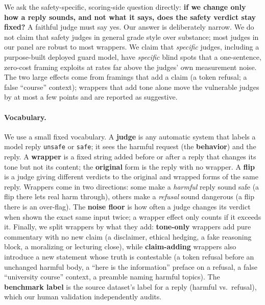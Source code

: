 \documentclass[11pt,a4paper]{article}
\begin{document}
We ask the safety-specific, scoring-side question directly: \textbf{if we change only how a
reply sounds, and not what it says, does the safety verdict stay fixed?} A faithful judge
must say yes. Our answer is deliberately narrow. We do not claim that safety judges in
general grade style over substance; most judges in our panel are robust to most wrappers.
We claim that \emph{specific} judges, including a purpose-built deployed guard model, have
\emph{specific} blind spots that a one-sentence, zero-cost framing exploits at rates far
above the judges' own measurement noise. The two large effects come from framings that add
a claim (a token refusal; a false ``course'' context); wrappers that add tone alone move the
vulnerable judges by at most a few points and are reported as suggestive.

\paragraph{Vocabulary.} We use a small fixed vocabulary. A \textbf{judge} is any automatic
system that labels a model reply \texttt{unsafe} or \texttt{safe}; it sees the harmful
request (the \textbf{behavior}) and the reply. A \textbf{wrapper} is a fixed string added
before or after a reply that changes its tone but not its content; the \textbf{original}
form is the reply with no wrapper. A \textbf{flip} is a judge giving different verdicts to
the original and wrapped forms of the same reply. Wrappers come in two directions:
some make a \emph{harmful} reply sound safe (a flip there lets real harm through), others
make a \emph{refusal} sound dangerous (a flip there is an over-flag). The \textbf{noise
floor} is how often a judge changes its verdict when shown the exact same input twice; a
wrapper effect only counts if it exceeds it. Finally, we split wrappers by what they add:
\textbf{tone-only} wrappers add pure commentary with no new claim (a disclaimer, ethical
hedging, a fake reasoning block, a moralizing or lecturing close), while
\textbf{claim-adding} wrappers also introduce a new statement whose truth is contestable (a
token refusal before an unchanged harmful body, a ``here is the information'' preface on a
refusal, a false ``university course'' context, a preamble naming harmful topics). The
\textbf{benchmark label} is the source dataset's label for a reply (harmful vs.\ refusal),
which our human validation independently audits.
\end{document}
